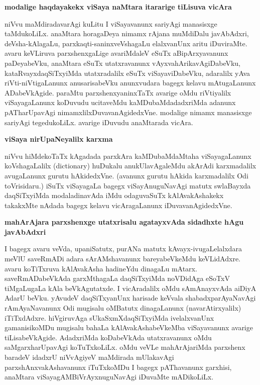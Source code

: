 {\bigskip
\noindent
{\large\bf modalige haqdayakekx viSaya naMtara itararige tiLisuva vicAra}}\label{page131}
\medskip

\noindent
niVvu maMdiradavarAgi kuLitu I viSayavanunx sariyAgi manasisxge taMdukoLiLx. anaMtara horagaDeya nimamx rAjana muMdiDalu javAbAdxri, deVsha-kAla\-gaLu, parxkaqti-saninxveVshagaLu elalx\-vanUnx aritu iDuviraMte. avaru keVLiruva parxshenxgaLige avariMdaleV eSuTx aBipArxyavanunx paDeyabeVku, anaMtara\- eSuTx utatxravanunx vAyxvahArikavAgiDabeVku, kataRvayxdaqSiTxyiMda utatxradalilx eSuTx viSaya\-viDa\-beVku, adaralilx yAva riVti-niVtigaLanunx anusarisabeVku anunxvudara bagegx kelavu mAtugaLanunx ADa\-beVkA\-gide. paraMtu parxshenxyaninxTaTx avarige oMdu riVtiyalilx viSayagaLanunx koDuvudu ucitaveMdu kaMDubaMda\-dadxriMda adanunx pATharUpavAgi nimamxlilxDuvavanAgidedxVne. modalige nimamx manasisxge sari\-yAgi tegedu\-koLiLx. avarige iDuvudu anaMtarada vicAra.

{\bigskip
\noindent
{\large\bf viSaya nirUpaNeyalilx karxma}}
\medskip

\noindent
niVvu hiMdekoTaTx kAgadada parxkAra kaMDubaMdaMtaha viSayagaLanunx koVshagaLalilx ({\rm dictionary}) huDukalu anukUlavAgaleMdu akArAdi karxmadalilx avugaLanunx gurutu hAkidedxVne. (avanunx gurutu hAkida karxmadalilx Odi toVrisidaru.) iSuTx viSayagaLa bagegx viSayAnuguNavAgi matutx swlaBayxda daqSiTxyiMda modaladinavAda iMdu odaguvaSuTx kAlAvakAshakekx takakxMte nAdada bagegx kelavu vicAra\-gaLanunx iDuvavanAgidedxVne.

\newpage

{\bigskip
\noindent
{\large\bf mahArAjara parxshenxge utatxrisalu agatayxvAda sidadhxte hAgu javAbAdxri}}\label{page131}
\medskip

\noindent
I bagegx avaru veVda, upaniSatutx, purANa matutx kAvayx-ivugaLelalxdara meVlU saveRmADi adara sArAMshavanunx bareyabeVkeMdu keVLidAdxre. avaru koTiTxruva kAlAvakAsha hadineYdu dinagaLu mAtarx. saveRmADabeVkAda garxMthagaLa daqSiTxyiMda noVDidAga eSoTxV tiMgaLugaLa kAla beVkAgutatxde. I vicAra\-dalilx oMdu sAmAnayxvAda aiDiyA AdarU beVku. yAvudeV daqSiTxyanUnx harisade keVvala shabadxparA\-yaNa\-vAgi rAmAyaNavanunx Odi mugisalu oMBatutx dinagaLanunx (navarAtirxyalilx) iTiTxdAdxre. hiVgiru\-vAga sUkaSxmXdaqSiTxyiMda ivelalxvanUnx gamanisikoMDu mugisalu bahaLa kAlAvakAshabeVkeMba viSaya\-vanunx avarige tiLisabeVkAgide. AdadxriMda koDabeVkAda utatxravanunx oMdu saMgarxharUpavAgi koTuTx\-koLiLx. oMdu veVLe mahArAjariMda parxshenx baradeV idadxrU niVvAgiyeV maMdirada mUlakavAgi parxshAnxva\-kAshavanunx iTuTxkoMDu I bagegx pAThavanunx garxhisi, anaMtara viSayagAMBiVrAyxnuguNavAgi iDu\-vaMte mADikoLiLx.

